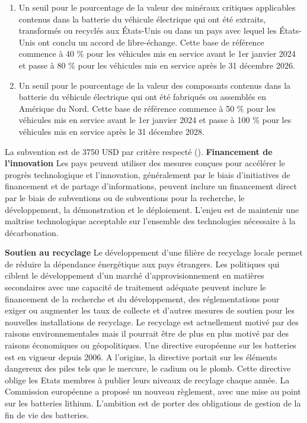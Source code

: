 \begin{enumerate}
    \item Un seuil pour le pourcentage de la valeur des minéraux critiques applicables contenus dans la batterie du véhicule électrique qui ont été extraits, transformés ou recyclés aux États-Unis ou dans un pays avec lequel les États-Unis ont conclu un accord de libre-échange. Cette base de référence commence à 40 \% pour les véhicules mis en service avant le 1er janvier 2024 et passe à 80 \% pour les véhicules mis en service après le 31 décembre 2026.
    \item Un seuil pour le pourcentage de la valeur des composants contenus dans la batterie du véhicule électrique qui ont été fabriqués ou assemblés en Amérique du Nord. Cette base de référence commence à 50 \% pour les véhicules mis en service avant le 1er janvier 2024 et passe à 100 \% pour les véhicules mis en service après le 31 décembre 2028.
\end{enumerate}
La subvention est de 3750 USD par critère respecté (\cite{us_government_inflation_2022}).\smallbreak
\bigbreak
\textbf{Financement de l'innovation}\smallbreak
Les pays peuvent utiliser des mesures conçues pour accélérer le progrès technologique et l'innovation, généralement par le biais d'initiatives de financement et de partage d'informations, peuvent inclure un financement direct par le biais de subventions ou de subventions pour la recherche, le développement, la démonstration et le déploiement. L'enjeu est de maintenir une maîtrise technologique acceptable sur l'ensemble des technologies nécessaire à la décarbonation.\bigbreak

\textbf{Soutien au recyclage}\smallbreak
Le développement d'une filière de recyclage locale permet de réduire la dépendance énergétique aux pays étrangers. Les politiques qui ciblent le développement d'un marché d'approvisionnement en matières secondaires avec une capacité de traitement adéquate peuvent inclure le financement de la recherche et du développement, des réglementations pour exiger ou augmenter les taux de collecte et d'autres mesures de soutien pour les nouvelles installations de recyclage.\smallbreak
Le recyclage est actuellement motivé par des raisons environnementales mais il pourrait être de plus en plus motivé par des raisons économiques ou géopolitiques. Une directive européenne sur les batteries est en vigueur depuis 2006. A l'origine, la directive portait sur les éléments dangereux des piles tels que le mercure, le cadium ou le plomb. Cette directive oblige les Etats membres à publier leurs niveaux de recylage chaque année. La Commission européenne a proposé un nouveau règlement, avec une mise au point sur les batteries lithium. L'ambition est de porter des obligations de gestion de la fin de vie des batteries.\smallbreak